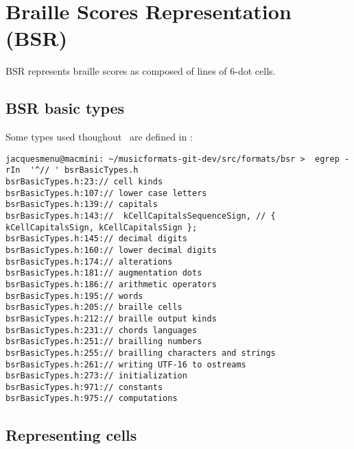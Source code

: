 
\chapter{Braille Scores Representation (BSR)}

BSR represents braille scores as composed of lines of 6-dot cells.


\section{BSR basic types}\label{BSR basic types}

Some types used thoughout \bsrRepr\ are defined in :%
\begin{lstlisting}[language=Terminal]
jacquesmenu@macmini: ~/musicformats-git-dev/src/formats/bsr >  egrep -rIn  '^// ' bsrBasicTypes.h
bsrBasicTypes.h:23:// cell kinds
bsrBasicTypes.h:107:// lower case letters
bsrBasicTypes.h:139:// capitals
bsrBasicTypes.h:143://  kCellCapitalsSequenceSign, // { kCellCapitalsSign, kCellCapitalsSign };
bsrBasicTypes.h:145:// decimal digits
bsrBasicTypes.h:160:// lower decimal digits
bsrBasicTypes.h:174:// alterations
bsrBasicTypes.h:181:// augmentation dots
bsrBasicTypes.h:186:// arithmetic operators
bsrBasicTypes.h:195:// words
bsrBasicTypes.h:205:// braille cells
bsrBasicTypes.h:212:// braille output kinds
bsrBasicTypes.h:231:// chords languages
bsrBasicTypes.h:251:// brailling numbers
bsrBasicTypes.h:255:// brailling characters and strings
bsrBasicTypes.h:261:// writing UTF-16 to ostreams
bsrBasicTypes.h:273:// initialization
bsrBasicTypes.h:971:// constants
bsrBasicTypes.h:975:// computations
\end{lstlisting}


\section{Representing cells}

